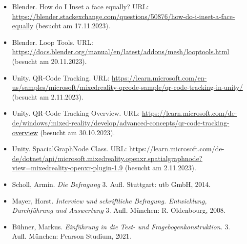 \begin{itemize}
    \item Blender. How do I Inset a face equally? URL: \url{https://blender.stackexchange.com/questions/50876/how-do-i-inset-a-face-equally} (besucht am 17.11.2023).
    \item Blender. Loop Tools. URL: \url{https://docs.blender.org/manual/en/latest/addons/mesh/looptools.html} (besucht am 20.11.2023).
    \item Unity. QR-Code Tracking. URL: \url{https://learn.microsoft.com/en-us/samples/microsoft/mixedreality-qrcode-sample/qr-code-tracking-in-unity/} (besucht am 2.11.2023).
    \item Unity. QR-Code Tracking Overview. URL: \url{https://learn.microsoft.com/de-de/windows/mixed-reality/develop/advanced-concepts/qr-code-tracking-overview} (besucht am 30.10.2023).
    \item Unity. SpacialGraphNode Class. URL: \url{https://learn.microsoft.com/de-de/dotnet/api/microsoft.mixedreality.openxr.spatialgraphnode?view=mixedreality-openxr-plugin-1.9} (besucht am 2.11.2023).
    \item Scholl, Armin. \textit{Die Befragung} 3. Aufl. Stuttgart: utb GmbH, 2014.
    \item Mayer, Horst. \textit{Interview und schriftliche Befragung. Entwicklung, Durchführung und Auswertung} 3. Aufl. München: R. Oldenbourg, 2008.
    \item Bühner, Markus. \textit{Einführung in die Test- und Fragebogenkonstruktion.} 3. Aufl. München: Pearson Studium, 2021.
\end{itemize}



